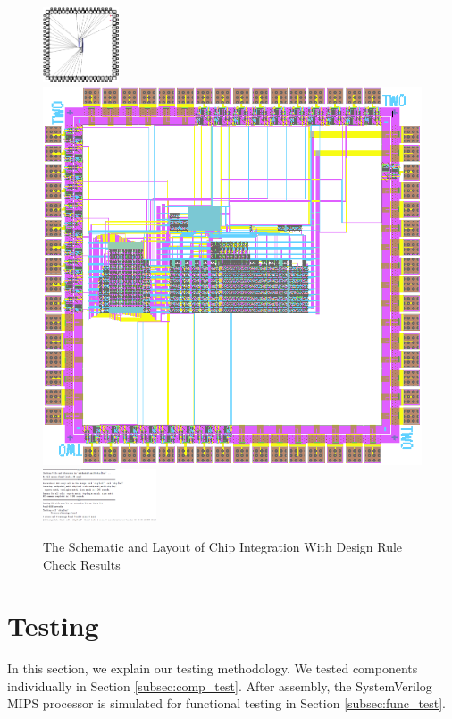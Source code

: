 \documentclass[conference]{IEEEtran}
\begin{document}
\begin{figure}[h!]
  \centering
    \includegraphics[width=0.2\textwidth]{chip_sch} \includegraphics[scale=0.25]{chip_lay} \includegraphics[width=0.3\textwidth]{chip_check}
  \caption{The Schematic and Layout of Chip Integration With Design Rule Check Results}
  \label{fig:chip}
\end{figure}

\section{Testing}\label{testing}
In this section, we explain our testing methodology. We tested components
individually in Section \ref{subsec:comp_test}. After assembly, the SystemVerilog MIPS
processor is simulated for functional testing in Section \ref{subsec:func_test}.
\end{document}
